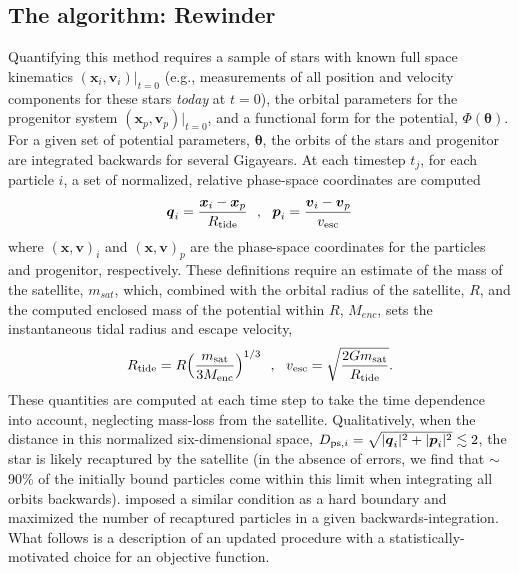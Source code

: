 \documentclass{emulateapj}
\newcommand{\bs}{\boldsymbol}
\begin{document}
\subsection{The algorithm: Rewinder}
Quantifying this method requires a sample of stars with known full
space kinematics $(\bs{x}_{i}, \bs{v}_{i})|_{t=0}$ (e.g., measurements
of all position and velocity components for these stars \emph{today}
at $t=0$), the orbital parameters for the progenitor system
$(\bs{x}_p, \bs{v}_p)|_{t=0}$, and a functional form for the
potential, $\Phi({\boldsymbol\theta})$. For a given set of potential
parameters, $\boldsymbol\theta$, the orbits of the stars and
progenitor are integrated backwards for several Gigayears. At
each timestep $t_j$, for each particle $i$, a set of normalized,
relative phase-space coordinates are computed
\begin{equation}
  \bs{q}_{i} = \frac{\bs{x}_{i} -
    \bs{x}_{p}}{R_{\rm tide}}\,\,\,\,,\,\,\,\,\bs{p}_{i} = \frac{\bs{v}_{i} -
    \bs{v}_{p}}{v_{\rm esc}}
\end{equation}
where $(\bs{x},\bs{v})_{i}$ and $(\bs{x},\bs{v})_{p}$ are the
phase-space coordinates for the particles and progenitor,
respectively. These definitions require an estimate of the mass of the
satellite, $m_{sat}$, which, combined with the orbital radius of the
satellite, $R$, and the computed enclosed mass of the potential within
$R$, $M_{enc}$, sets the instantaneous tidal radius and escape
velocity,
\begin{equation}
  R_{\rm tide}=R\Big(\frac{m_{\rm sat}}{3M_{\rm enc}}\Big)^{1/3}\,\,\,\,,\,\,\,\,
  v_{\rm esc}=\sqrt{\frac{2Gm_{\rm sat}}{R_{\rm tide}}}.
\end{equation}
These quantities are computed at each time step to take the time 
dependence into account, neglecting mass-loss from the satellite.
Qualitatively, when the distance in this normalized six-dimensional
space, $D_{{\rm ps},i}=\sqrt{|\bs{q}_{i}|^2+|\bs{p}_{i}|^2} \lesssim 2$, 
the star is likely recaptured by the satellite (in the absence of errors,
 we find that $\sim$90\% of the initially bound particles come within
 this limit when integrating all orbits backwards). \citet{johnston99a} 
 imposed a similar condition as a hard boundary and maximized the 
number of recaptured particles in a given backwards-integration.
What follows is a description of an updated procedure with a 
statistically-motivated choice for an objective function.
\end{document}
